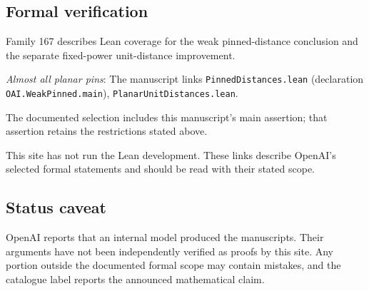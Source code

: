 \documentclass[11pt]{article}
\begin{document}
\subsection{Formal verification}
Family 167 describes Lean coverage for the weak pinned-distance conclusion and the separate fixed-power unit-distance improvement.

\textit{Almost all planar pins}: The manuscript links \texttt{PinnedDistances.lean} (declaration \texttt{OAI.WeakPinned.main}), \texttt{PlanarUnitDistances.lean}.

The documented selection includes this manuscript’s main assertion; that assertion retains the restrictions stated above.

This site has not run the Lean development. These links describe OpenAI’s selected formal statements and should be read with their stated scope.

\subsection{Status caveat}
OpenAI reports that an internal model produced the manuscripts. Their arguments have not been independently verified as proofs by this site. Any portion outside the documented formal scope may contain mistakes, and the catalogue label reports the announced mathematical claim.
\end{document}
